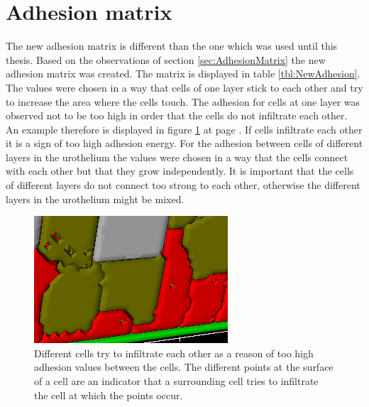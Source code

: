 \section{Adhesion matrix}
The new adhesion matrix is different than the one which was used until this thesis. Based on the observations of section \ref{sec:AdhesionMatrix} the new adhesion matrix was created. The matrix is displayed in table \ref{tbl:NewAdhesion}. The values were chosen in a way that cells of one layer stick to each other and try to increase the area where the cells touch. The adhesion for cells at one layer was observed not to be too high in order that the cells do not infiltrate each other. An example therefore is displayed in figure \ref{img:InfiltratingCells} at page \pageref{img:InfiltratingCells}. If cells infiltrate each other it is a sign of too high adhesion energy. For the adhesion between cells of different layers in the urothelium the values were chosen in a way that the cells connect with each other but that they grow independently. It is important that the cells of different layers do not connect too strong to each other, otherwise the different layers in the urothelium might be mixed. 
\begin{figure}[ht]
	\center
	\includegraphics[scale=1.2]{figures/TooHighAdhesion1.png}
	\caption[Different cells try to infiltrate each other]{Different cells try to infiltrate each other as a reason of too high adhesion values between the cells. The different points at the surface of a cell are an indicator that a surrounding cell tries to infiltrate the cell at which the points occur.}
	\label{img:InfiltratingCells}
\end{figure}


